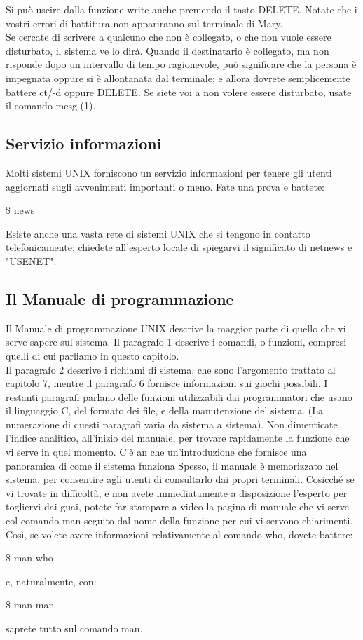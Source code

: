 Si può uscire dalla funzione write anche premendo il tasto DELETE. Notate che i vostri
errori di battitura non appariranno sul terminale di Mary.\\
Se cercate di scrivere a qualcuno che non è collegato, o che non vuole essere disturbato,
il sistema ve lo dirà. Quando il destinatario è collegato, ma non risponde dopo un
intervallo di tempo ragionevole, può significare che la persona è impegnata oppure si
è allontanata dal terminale; e allora dovrete semplicemente battere ct/-d oppure DELETE.
Se siete voi a non volere essere disturbato, usate il comando mesg (1).
\subsection{Servizio informazioni}
Molti sistemi UNIX forniscono un servizio informazioni per tenere gli utenti aggiornati
sugli avvenimenti importanti o meno. Fate una prova e battete:
\begin{multicols}{2}
	\$ news\\
\end{multicols}
Esiste anche una vasta rete di sistemi UNIX che si tengono in contatto telefonicamente;
chiedete all'esperto locale di spiegarvi il significato di netnews e "USENET".
\subsection{Il Manuale di programmazione}
Il Manuale di programmazione UNIX descrive la maggior parte di quello che vi serve
sapere sul sistema. Il paragrafo 1 descrive i comandi, o funzioni, compresi quelli di
cui parliamo in questo capitolo.\\
Il paragrafo 2 descrive i richiami di sistema, che sono l'argomento trattato al capitolo 7,
mentre il paragrafo 6 fornisce informazioni sui giochi possibili. I restanti paragrafi
parlano delle funzioni utilizzabili dai programmatori che usano il linguaggio
C, del formato dei file, e della manutenzione del sistema. (La numerazione di questi
paragrafi varia da sistema a sistema). Non dimenticate l'indice analitico, all'inizio del
manuale, per trovare rapidamente la funzione che vi serve in quel momento. C'è an
che un'introduzione che fornisce una panoramica di come il sistema funziona
Spesso, il manuale è memorizzato nel sistema, per consentire agli utenti di consultarlo
dai propri terminali. Cosicché se vi trovate in difficoltà, e non avete immediatamente a
disposizione l'esperto per togliervi dai guai, potete far stampare a video la
pagina di manuale che vi serve col comando man seguito dal nome della funzione per
cui vi servono chiarimenti. Così, se volete avere informazioni relativamente al comando 
who, dovete battere:
\begin{multicols}{2}
	\$ man who\\
\end{multicols}
e, naturalmente, con:
\begin{multicols}{2}
	\$ man man\\
\end{multicols}
saprete tutto sul comando man.

